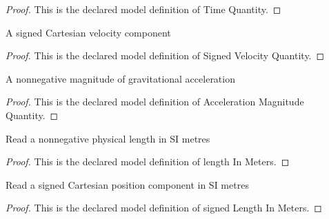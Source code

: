 \begin{proof}
  This is the declared model definition of Time Quantity.
\end{proof}
\begin{definition}
  \label{def:physics:phyx-mini-0747:phyxminiproblems-problemphyxmini0747-signedvelocityquantity}
  A signed Cartesian velocity component
\end{definition}
\begin{proof}
  This is the declared model definition of Signed Velocity Quantity.
\end{proof}
\begin{definition}
  \label{def:physics:phyx-mini-0747:phyxminiproblems-problemphyxmini0747-accelerationmagnitudequantity}
  A nonnegative magnitude of gravitational acceleration
\end{definition}
\begin{proof}
  This is the declared model definition of Acceleration Magnitude Quantity.
\end{proof}
\begin{definition}
  \label{def:physics:phyx-mini-0747:phyxminiproblems-problemphyxmini0747-lengthinmeters}
  Read a nonnegative physical length in SI metres
\end{definition}
\begin{proof}
  This is the declared model definition of length In Meters.
\end{proof}
\begin{definition}
  \label{def:physics:phyx-mini-0747:phyxminiproblems-problemphyxmini0747-signedlengthinmeters}
  Read a signed Cartesian position component in SI metres
\end{definition}
\begin{proof}
  This is the declared model definition of signed Length In Meters.
\end{proof}
